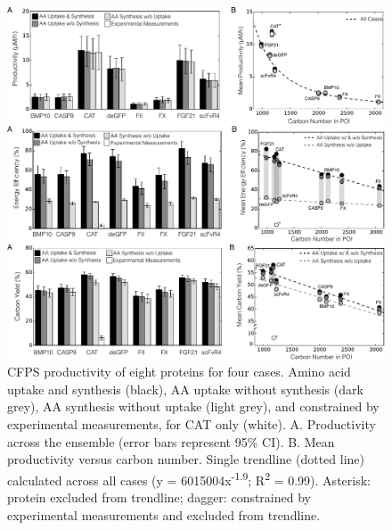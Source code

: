 \documentclass[journal=asbcd6,manuscript=article]{achemso}
\begin{document}
\begin{figure}[t!]
\centering
\includegraphics[width=1.00\textwidth]{./figs/Fig-2-Performance-Analysis.pdf}
\caption{CFPS productivity of eight proteins for four cases. Amino acid uptake and synthesis (black), AA uptake without synthesis (dark grey), AA synthesis without uptake (light grey), and constrained by experimental measurements, for CAT only (white). A. Productivity across the ensemble (error bars represent 95\% CI). B. Mean productivity versus carbon number. Single trendline (dotted line) calculated across all cases (y = 6015004x\textsuperscript{-1.9}; R\textsuperscript{2} = 0.99). Asterisk: protein excluded from trendline; dagger: constrained by experimental measurements and excluded from trendline.}
\label{fig:Prod}
\end{figure}
\end{document}
